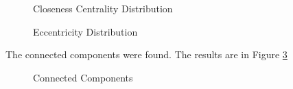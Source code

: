 \begin{figure}[h!]
\centering
{}
\caption{Closeness Centrality Distribution}
\label{fig:closeness}
\end{figure}

\clearpage

\begin{figure}[h!]
\centering
{}
\caption{Eccentricity Distribution}
\label{fig:eccentricity}
\end{figure}

The connected components were found. The results are in Figure \ref{fig:connected}

\begin{figure}[h!]
\centering
{}
\caption{Connected Components}
\label{fig:connected}
\end{figure}